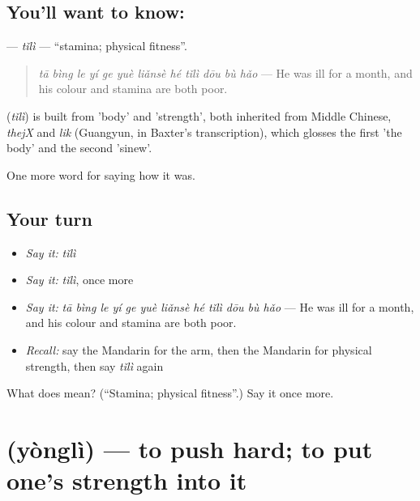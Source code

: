 \subsection*{You'll want to know: }
\textbf{} — \emph{tǐlì} — \textquotedblleft{}stamina; physical fitness\textquotedblright{}.

\begin{quote}
\textbf{} \emph{tā bìng le yí ge yuè liǎnsè hé tǐlì dōu bù hǎo} — He was ill for a month, and his colour and stamina are both poor.
\end{quote}

\begin{cousinweb}
\textbf{} (\emph{tǐlì}) is built from  'body' and  'strength', both inherited from Middle Chinese, \emph{thejX} and \emph{lik} (Guangyun, in Baxter's transcription), which glosses the first 'the body' and the second 'sinew'.
\end{cousinweb}

\begin{grammarlens}[title={What you've built}]
One more word for saying how it was.
\end{grammarlens}

\subsection*{Your turn}
\begin{itemize}
\raggedright
  \item \emph{Say it:} \emph{tǐlì}
  \item \emph{Say it:} \emph{tǐlì}, once more
  \item \emph{Say it:} \emph{tā bìng le yí ge yuè liǎnsè hé tǐlì dōu bù hǎo} — He was ill for a month, and his colour and stamina are both poor.
  \item \emph{Recall:} say the Mandarin for the arm, then the Mandarin for physical strength, then say \emph{tǐlì} again
\end{itemize}

\begin{tcolorbox}[breakable,colback=teal!4,colframe=teal!35!black,title={Before you move on}]
What does  mean? (\textquotedblleft{}Stamina; physical fitness\textquotedblright{}.) Say it once more.
\end{tcolorbox}
\section[\texorpdfstring{\zh{用力} (yònglì)}{用力 (yònglì)}]{ (yònglì) — to push hard; to put one's strength into it}

